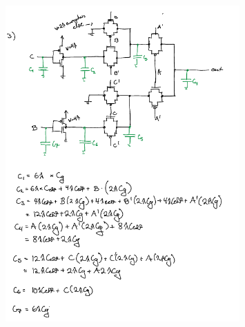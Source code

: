 \documentclass[11pt]{article}
\begin{document}
\begin{figure}[H]
    \centering
\includegraphics[width=0.8\textwidth]{3a.png}
\end{figure}
\end{document}
